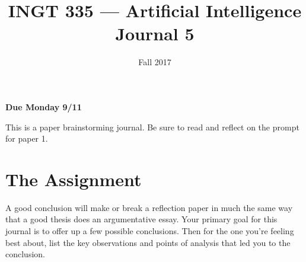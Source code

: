 \documentclass[nobib]{tufte-handout}
\title{INGT 335 --- Artificial Intelligence \\ Journal 5}
\author{}
\date{ Fall 2017 }
\begin{document}
\maketitle

\begin{center}
  \textbf{Due Monday 9/11}
\end{center}

This is a paper brainstorming journal. Be sure to read and reflect on the prompt for paper 1.

\section{The Assignment}

A good conclusion will make or break a reflection paper in much the same way that a good thesis does an argumentative essay. Your primary goal for this journal is to offer up a few possible conclusions. Then for the one you're feeling best  about, list the key observations and points of analysis that led you to the conclusion.
\end{document}

